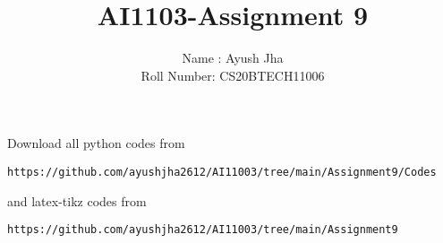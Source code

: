 \documentclass[journal,12pt,twocolumn]{IEEEtran}
\DeclareMathOperator*{\Res}{Res}
\begin{document}
\newcommand{\BEQA}{\begin{eqnarray}}
\newcommand{\EEQA}{\end{eqnarray}}
\newcommand{\define}{\stackrel{\triangle}{=}}

\raggedbottom
\setlength{\parindent}{0pt}
\providecommand{\mbf}{\mathbf}
\providecommand{\pr}[1]{\ensuremath{\Pr\left(#1\right)}}
\providecommand{\qfunc}[1]{\ensuremath{Q\left(#1\right)}}
\providecommand{\sbrak}[1]{\ensuremath{{}\left[#1\right]}}
\providecommand{\lsbrak}[1]{\ensuremath{{}\left[#1\right.}}
\providecommand{\rsbrak}[1]{\ensuremath{{}\left.#1\right]}}
\providecommand{\brak}[1]{\ensuremath{\left(#1\right)}}
\providecommand{\lbrak}[1]{\ensuremath{\left(#1\right.}}
\providecommand{\rbrak}[1]{\ensuremath{\left.#1\right)}}
\providecommand{\cbrak}[1]{\ensuremath{\left\{#1\right\}}}
\providecommand{\lcbrak}[1]{\ensuremath{\left\{#1\right.}}
\providecommand{\rcbrak}[1]{\ensuremath{\left.#1\right\}}}
\theoremstyle{remark}
\newtheorem{rem}{Remark}
\newcommand{\sgn}{\mathop{\mathrm{sgn}}}
\providecommand{\abs}[1]{\vert#1\vert}
\providecommand{\res}[1]{\Res\displaylimits_{#1}} 
\providecommand{\norm}[1]{\lVert#1\rVert}
\providecommand{\mtx}[1]{\mathbf{#1}}
\providecommand{\mean}[1]{E[ #1 ]}
\providecommand{\fourier}{\overset{\mathcal{F}}{ \rightleftharpoons}}
\providecommand{\system}{\overset{\mathcal{H}}{ \longleftrightarrow}}
\newcommand{\solution}{\noindent \textbf{Solution: }}
\newcommand{\cosec}{\,\text{cosec}\,}
\providecommand{\dec}[2]{\ensuremath{\overset{#1}{\underset{#2}{\gtrless}}}}
\newcommand{\myvec}[1]{\ensuremath{\begin{pmatrix}#1\end{pmatrix}}}
\newcommand{\mydet}[1]{\ensuremath{\begin{vmatrix}#1\end{vmatrix}}}
\makeatletter
{}
\makeatother
\let\StandardTheFigure\thefigure
\let\vec\mathbf
\renewcommand{\thefigure}{\theproblem}
\def\putbox#1#2#3{\makebox[0in][l]{\makebox[#1][l]{}\raisebox{\baselineskip}[0in][0in]{\raisebox{#2}[0in][0in]{#3}}}}
     \def\rightbox#1{\makebox[0in][r]{#1}}
     \def\centbox#1{\makebox[0in]{#1}}
     \def\topbox#1{\raisebox{-\baselineskip}[0in][0in]{#1}}
     \def\midbox#1{\raisebox{-0.5\baselineskip}[0in][0in]{#1}}
\vspace{3cm}
\title{AI1103-Assignment 9}
\author{Name : Ayush Jha \\ Roll Number: CS20BTECH11006}
\maketitle
\newpage
\bigskip
\renewcommand{\thefigure}{\theenumi}
\renewcommand{\thetable}{\theenumi}
Download all python codes from 
\begin{lstlisting}
https://github.com/ayushjha2612/AI11003/tree/main/Assignment9/Codes
\end{lstlisting}
%
and latex-tikz codes from 
%
\begin{lstlisting}
https://github.com/ayushjha2612/AI11003/tree/main/Assignment9
\end{lstlisting}
\end{document}
